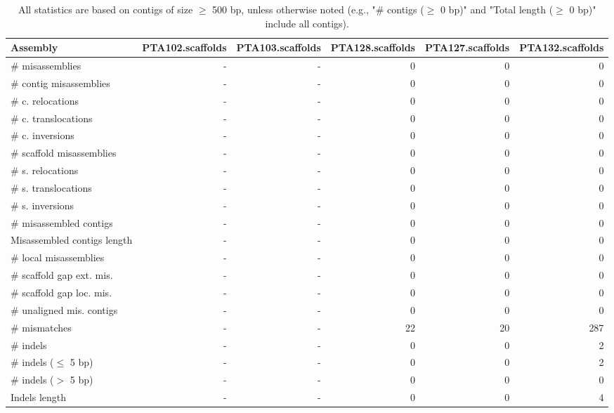 \documentclass[12pt,a4paper]{article}
\begin{document}
\begin{table}[ht]
\begin{center}
\caption{All statistics are based on contigs of size $\geq$ 500 bp, unless otherwise noted (e.g., "\# contigs ($\geq$ 0 bp)" and "Total length ($\geq$ 0 bp)" include all contigs).}
\begin{tabular}{|l*{5}{|r}|}
\hline
Assembly & PTA102.scaffolds & PTA103.scaffolds & PTA128.scaffolds & PTA127.scaffolds & PTA132.scaffolds \\ \hline
\# misassemblies & - & - & 0 & 0 & 0 \\ \hline
\hspace{2mm}\# contig misassemblies & - & - & 0 & 0 & 0 \\ \hline
\hspace{5mm}\# c. relocations & - & - & 0 & 0 & 0 \\ \hline
\hspace{5mm}\# c. translocations & - & - & 0 & 0 & 0 \\ \hline
\hspace{5mm}\# c. inversions & - & - & 0 & 0 & 0 \\ \hline
\hspace{2mm}\# scaffold misassemblies & - & - & 0 & 0 & 0 \\ \hline
\hspace{5mm}\# s. relocations & - & - & 0 & 0 & 0 \\ \hline
\hspace{5mm}\# s. translocations & - & - & 0 & 0 & 0 \\ \hline
\hspace{5mm}\# s. inversions & - & - & 0 & 0 & 0 \\ \hline
\# misassembled contigs & - & - & 0 & 0 & 0 \\ \hline
Misassembled contigs length & - & - & 0 & 0 & 0 \\ \hline
\# local misassemblies & - & - & 0 & 0 & 0 \\ \hline
\# scaffold gap ext. mis. & - & - & 0 & 0 & 0 \\ \hline
\# scaffold gap loc. mis. & - & - & 0 & 0 & 0 \\ \hline
\# unaligned mis. contigs & - & - & 0 & 0 & 0 \\ \hline
\# mismatches & - & - & 22 & 20 & 287 \\ \hline
\# indels & - & - & 0 & 0 & 2 \\ \hline
\hspace{5mm}\# indels ($\leq$ 5 bp) & - & - & 0 & 0 & 2 \\ \hline
\hspace{5mm}\# indels ($>$ 5 bp) & - & - & 0 & 0 & 0 \\ \hline
Indels length & - & - & 0 & 0 & 4 \\ \hline
\end{tabular}
\end{center}
\end{table}
\end{document}
